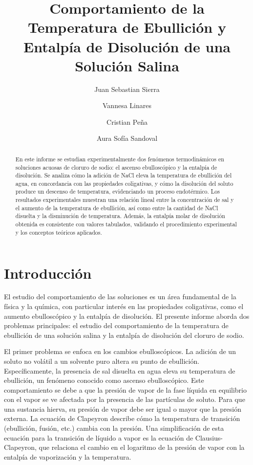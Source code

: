 \documentclass{article}
\title{Comportamiento de la Temperatura de Ebullición y Entalpía de Disolución de una Solución Salina}
\author{Juan Sebastian Sierra}
\author{Vannesa Linares}
\author{Cristian Peña}
\author{Aura Sofía Sandoval}
\affil{Departamento de Física - Universidad Nacional de Colombia}
\begin{document}
\maketitle

\begin{abstract}
En este informe se estudian experimentalmente dos fenómenos termodinámicos en soluciones acuosas de cloruro de sodio: el ascenso ebulloscópico y la entalpía de disolución. Se analiza cómo la adición de NaCl eleva la temperatura de ebullición del agua, en concordancia con las propiedades coligativas, y cómo la disolución del soluto produce un descenso de temperatura, evidenciando un proceso endotérmico. Los resultados experimentales muestran una relación lineal entre la concentración de sal y el aumento de la temperatura de ebullición, así como entre la cantidad de NaCl disuelta y la disminución de temperatura. Además, la entalpía molar de disolución obtenida es consistente con valores tabulados, validando el procedimiento experimental y los conceptos teóricos aplicados.
\end{abstract}

\section{Introducción}
El estudio del comportamiento de las soluciones es un área fundamental de la física y la química, con particular interés en las propiedades coligativas, como el aumento ebulloscópico y la entalpía de disolución. El presente informe aborda dos problemas principales: el estudio del comportamiento de la temperatura de ebullición de una solución salina y la entalpía de disolución del cloruro de sodio.

El primer problema se enfoca en los cambios ebulloscópicos. La adición de un soluto no volátil a un solvente puro altera su punto de ebullición. Específicamente, la presencia de sal disuelta en agua eleva su temperatura de ebullición, un fenómeno conocido como ascenso ebulloscópico. Este comportamiento se debe a que la presión de vapor de la fase líquida en equilibrio con el vapor se ve afectada por la presencia de las partículas de soluto. Para que una sustancia hierva, su presión de vapor debe ser igual o mayor que la presión externa. La ecuación de Clapeyron describe cómo la temperatura de transición (ebullición, fusión, etc.) cambia con la presión. Una simplificación de esta ecuación para la transición de líquido a vapor es la ecuación de Clausius-Clapeyron, que relaciona el cambio en el logaritmo de la presión de vapor con la entalpía de vaporización y la temperatura.
\end{document}
